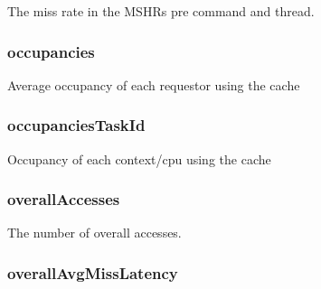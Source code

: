 \label{group__CacheStatistics_ga2e5641462c14394bea8a57328586ab08}
The miss rate in the MSHRs pre command and thread. \hypertarget{group__CacheStatistics_ga5626c7c93bb670e27e205ceba0240361}{
\subsubsection[{occupancies}]{ occupancies}}
\label{group__CacheStatistics_ga5626c7c93bb670e27e205ceba0240361}
Average occupancy of each requestor using the cache \hypertarget{group__CacheStatistics_ga6fa3359c33f65a569c3e2adc8d04dc26}{
\subsubsection[{occupanciesTaskId}]{ occupanciesTaskId}}
\label{group__CacheStatistics_ga6fa3359c33f65a569c3e2adc8d04dc26}
Occupancy of each context/cpu using the cache \hypertarget{group__CacheStatistics_ga84cca53e5e12d55fe025a3a22bd77a28}{
\subsubsection[{overallAccesses}]{ overallAccesses}}
\label{group__CacheStatistics_ga84cca53e5e12d55fe025a3a22bd77a28}
The number of overall accesses. \hypertarget{group__CacheStatistics_ga1246f7d24c92b2c043128804bb772c53}{
\subsubsection[{overallAvgMissLatency}]{ overallAvgMissLatency}}
